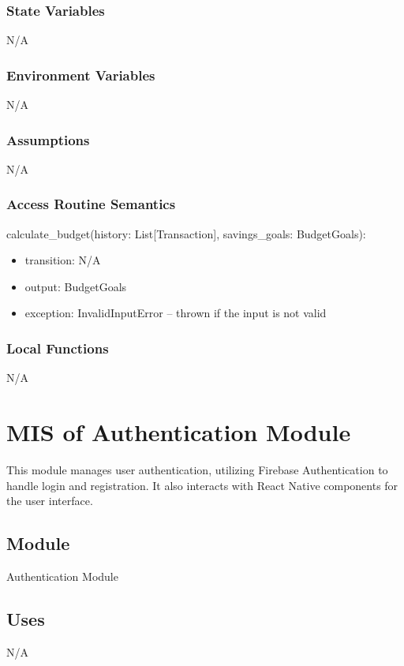 \documentclass[12pt, titlepage]{article}
\begin{document}
\subsubsection{State Variables}
N/A

\subsubsection{Environment Variables}
N/A

\subsubsection{Assumptions}
N/A

\subsubsection{Access Routine Semantics}

\noindent calculate\_budget(history: List[Transaction], savings\_goals: BudgetGoals):
\begin{itemize}
\item transition: N/A
\item output: BudgetGoals
\item exception: InvalidInputError -- thrown if the input is not valid
\end{itemize}

\subsubsection{Local Functions}
N/A

\newpage


\section{MIS of Authentication Module}\label{Authentication_Module}
This module manages user authentication, utilizing Firebase Authentication to handle login and registration. It also interacts with React Native components for the user interface.

\subsection{Module}

Authentication Module

\subsection{Uses}
N/A
\end{document}
